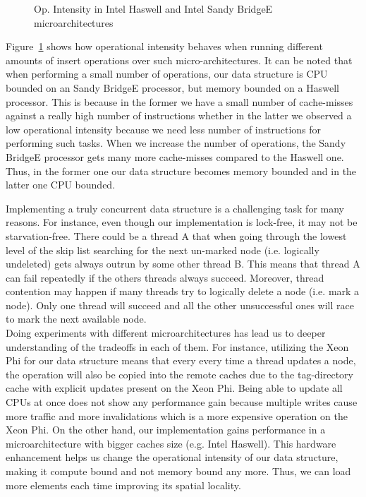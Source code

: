 \begin{figure}[t]
	\centering
	
	\caption{Op. Intensity in Intel Haswell and Intel Sandy BridgeE microarchitectures}
	\label{fig:haswell_ivybridge}
\end{figure}

Figure~\ref{fig:haswell_ivybridge} shows how operational intensity behaves when running different amounts of insert operations over such micro-architectures. It can be noted that when performing a small number of operations, our data structure is CPU bounded on an Sandy BridgeE processor, but memory bounded on a Haswell processor. This is because in the former we have a small number of cache-misses against a really high number of instructions whether in the latter we observed a low operational intensity because we need less number of instructions for performing such tasks. When we increase the number of operations, the Sandy BridgeE processor gets many more cache-misses compared to the Haswell one. Thus, in the former one our data structure becomes memory bounded and in the latter one CPU bounded.

Implementing a truly concurrent data structure is a challenging task for many reasons. For instance, even though our implementation is lock-free, it may not be starvation-free. There could be a thread A that when going through the lowest level of the skip list searching for the next un-marked node (i.e. logically undeleted) gets always outrun by some other thread B. This means that thread A can fail repeatedly if the others threads always succeed. Moreover, thread contention may happen if many threads try to logically delete a node (i.e. mark a node). Only one thread will succeed and all the other unsuccessful ones will race to mark
the next available node.\\
Doing experiments with different microarchitectures has lead us to deeper understanding of the tradeoffs in each of them. For instance, utilizing the Xeon Phi for our data structure means that every every time a thread updates a node, the operation will also be copied into the remote caches due to the tag-directory cache with explicit updates present on the Xeon Phi. Being able to update all CPUs at once does not show any performance gain because multiple writes cause more traffic and more invalidations which is a more expensive operation on the Xeon Phi. On the other hand, our implementation gains performance in a microarchitecture with bigger caches size (e.g. Intel Haswell). This hardware enhancement helps us change the operational intensity of our data structure, making it compute bound and not memory bound any more. Thus, we can load more elements each time improving its spatial locality.


